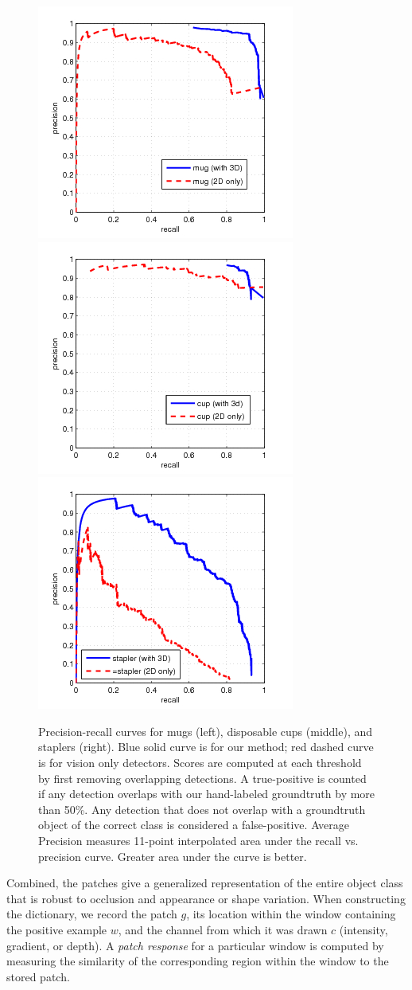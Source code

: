 \documentclass[letterpaper, 10 pt, conference]{ieeeconf}  %
\begin{document}
\begin{figure}[thb]
\begin{center}
  \includegraphics[width=0.32\linewidth]{pr_mug.jpg}
  \includegraphics[width=0.32\linewidth]{pr_cup.jpg}
  \includegraphics[width=0.32\linewidth]{pr_stapler.jpg}
\end{center}
\caption{Precision-recall curves for mugs (left), disposable cups
  (middle), and staplers (right). Blue solid curve is for our method;
  red dashed curve is for vision only detectors. Scores are computed
  at each threshold by first removing overlapping detections. A
  true-positive is counted if any detection overlaps with our
  hand-labeled groundtruth by more than 50\%. Any detection that does
  not overlap with a groundtruth object of the correct class is
  considered a false-positive. Average Precision measures 11-point
  interpolated area under the recall vs. precision curve. Greater area
  under the curve is better.}
\label{fig:pr_curves}
\end{figure}

Combined, the patches give a generalized representation of the entire object
class that is robust to occlusion and appearance or shape variation.  When
constructing the dictionary, we record the patch $g$, its location within the
window containing the positive example $w$, and the channel from which it was
drawn $c$ (intensity, gradient, or depth).  A \emph{patch response} for a
particular window is computed by measuring the similarity of the corresponding
region within the window to the stored patch.
\end{document}

